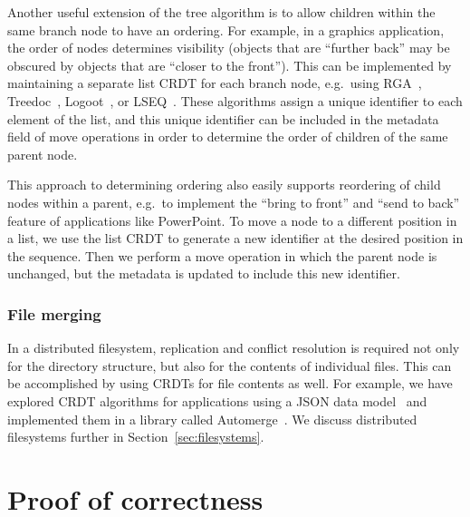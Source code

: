 \documentclass[sigconf]{acmart}
\begin{document}
Another useful extension of the tree algorithm is to allow children within the same branch node to have an ordering.
For example, in a graphics application, the order of nodes determines visibility (objects that are ``further back'' may be obscured by objects that are ``closer to the front'').
This can be implemented by maintaining a separate list CRDT for each branch node, e.g.\ using RGA~\cite{Roh:2011dw}, Treedoc~\cite{Preguica:2009fz}, Logoot~\cite{Weiss:2010hx}, or LSEQ~\cite{Nedelec:2013ky}.
These algorithms assign a unique identifier to each element of the list, and this unique identifier can be included in the metadata field of move operations in order to determine the order of children of the same parent node.

This approach to determining ordering also easily supports reordering of child nodes within a parent, e.g.\ to implement the ``bring to front'' and ``send to back'' feature of applications like PowerPoint.
To move a node to a different position in a list, we use the list CRDT to generate a new identifier at the desired position in the sequence.
Then we perform a move operation in which the parent node is unchanged, but the metadata is updated to include this new identifier.

\subsubsection{File merging}\label{sec:files}

In a distributed filesystem, replication and conflict resolution is required not only for the directory structure, but also for the contents of individual files.
This can be accomplished by using CRDTs for file contents as well.
For example, we have explored CRDT algorithms for applications using a JSON data model~\cite{Kleppmann:2016ve} and implemented them in a library called Automerge~\cite{Automerge}.
We discuss distributed filesystems further in Section~\ref{sec:filesystems}.


\section{Proof of correctness}\label{sec:proof}
\end{document}
